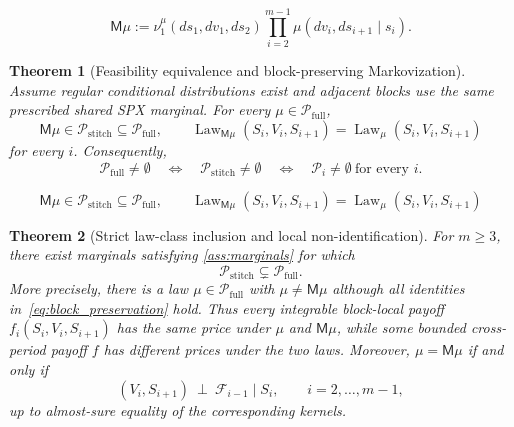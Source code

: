 \documentclass[10pt,a4paper]{amsart}
\newtheorem{theorem}{Theorem}
\DeclareMathOperator{\Law}{Law}
\newcommand{\cF}{\mathcal{F}}
\newcommand{\cP}{\mathcal{P}}
\begin{document}
\begin{equation}\label{eq:markovization}
\mathsf M\mu
:=
\nu_1^\mu(ds_1,dv_1,ds_2)
\prod_{i=2}^{m-1}\mu(dv_i,ds_{i+1}\mid s_i).
\end{equation}

\begin{theorem}[Feasibility equivalence and block-preserving Markovization]
\label{thm:feasibility_equivalence}
Assume regular conditional distributions exist and adjacent blocks use the same prescribed shared SPX marginal.
For every $\mu\in\cP_{\mathrm{full}}$,
\begin{equation}\label{eq:block_preservation}
    \mathsf M\mu\in\cP_{\mathrm{stitch}}\subseteq\cP_{\mathrm{full}},
    \qquad
    \Law_{\mathsf M\mu}(S_i,V_i,S_{i+1})
    =\Law_\mu(S_i,V_i,S_{i+1})
\end{equation}
for every $i$.
Consequently,
\begin{equation}\label{eq:feasibility_equivalence}
\cP_{\mathrm{full}}\neq\emptyset
\quad\Longleftrightarrow\quad
\cP_{\mathrm{stitch}}\neq\emptyset
\quad\Longleftrightarrow\quad
\cP_i\neq\emptyset\ \text{for every }i.
\end{equation}
\end{theorem}

\begin{equation}
    \mathsf M\mu\in\cP_{\mathrm{stitch}}\subseteq\cP_{\mathrm{full}},
    \qquad
    \Law_{\mathsf M\mu}(S_i,V_i,S_{i+1})
    =\Law_\mu(S_i,V_i,S_{i+1})
\end{equation}

\begin{theorem}[Strict law-class inclusion and local non-identification]
\label{thm:strict_inclusion}
For $m\geq3$, there exist marginals satisfying \cref{ass:marginals} for which
\begin{equation}
    \cP_{\mathrm{stitch}}\subsetneq\cP_{\mathrm{full}}.
\end{equation}
More precisely, there is a law $\mu\in\cP_{\mathrm{full}}$ with $\mu\neq\mathsf M\mu$ although all identities in~\eqref{eq:block_preservation} hold.
Thus every integrable block-local payoff $f_i(S_i,V_i,S_{i+1})$ has the same price under $\mu$ and $\mathsf M\mu$, while some bounded cross-period payoff $f$ has different prices under the two laws.
Moreover, $\mu=\mathsf M\mu$ if and only if
\begin{equation}\label{eq:stitched_ci}
    (V_i,S_{i+1})\ \perp\ \cF_{i-1}\mid S_i,
    \qquad i=2,\ldots,m-1,
\end{equation}
up to almost-sure equality of the corresponding kernels.
\end{theorem}
\end{document}
